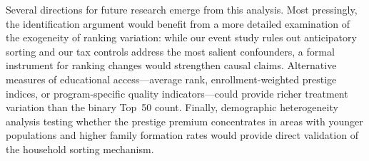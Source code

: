 \documentclass[12pt]{article}
\begin{document}
Several directions for future research emerge from this analysis. Most pressingly, the identification argument would benefit from a more detailed examination of the exogeneity of ranking variation: while our event study rules out anticipatory sorting and our tax controls address the most salient confounders, a formal instrument for ranking changes would strengthen causal claims. Alternative measures of educational access---average rank, enrollment-weighted prestige indices, or program-specific quality indicators---could provide richer treatment variation than the binary Top~50 count. Finally, demographic heterogeneity analysis testing whether the prestige premium concentrates in areas with younger populations and higher family formation rates would provide direct validation of the household sorting mechanism.
\end{document}
